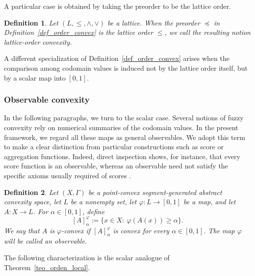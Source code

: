 \documentclass[11pt,a4paper]{article}
\newtheorem{definition}{Definition}
\begin{document}
\smallskip





\smallskip

A particular case is obtained by taking the preorder to be the lattice order.

\begin{definition}\label{def_lattice_order_convex}
Let \((L,\le,\wedge,\vee)\) be a lattice. When the preorder \(\preccurlyeq\) in Definition~\ref{def_order_convex} is the lattice order \(\le\), we call the resulting notion \emph{lattice-order convexity}.
\end{definition}



A different specialization of Definition~\ref{def_order_convex} arises when the comparison among codomain values is induced not by the lattice order itself, but by a scalar map into \([0,1]\).



\subsubsection{Observable convexity}

\smallskip

In the following paragraphs, we turn to the scalar case. Several notions of fuzzy convexity rely on numerical summaries of the codomain values. In the present framework, we regard all these maps as general observables. We adopt this term to make a clear distinction from particular constructions such as score or aggregation functions. Indeed, direct inspection shows, for instance, that every score function is an observable, whereas an observable need not satisfy the specific axioms usually required of scores \citep{Alcantud}.



\begin{definition}\label{def_observable_convex}
Let \((X,\Gamma)\) be a point-convex segment-generated abstract convexity space, let \(L\) be a nonempty set, let \(\varphi:L\to[0,1]\) be a map, and let \(A:X\to L\). For \(\alpha\in[0,1]\), define
\[
[A]^\varphi_\alpha:=\{x\in X:\ \varphi(A(x))\ge \alpha\}.
\]
We say that \(A\) is \emph{\(\varphi\)-convex} if \([A]^\varphi_\alpha\) is convex for every \(\alpha\in[0,1]\). The map \(\varphi\) will be called an \emph{observable}.
\end{definition}

The following characterization is the scalar analogue of Theorem~\ref{teo_orden_local}.
\end{document}
